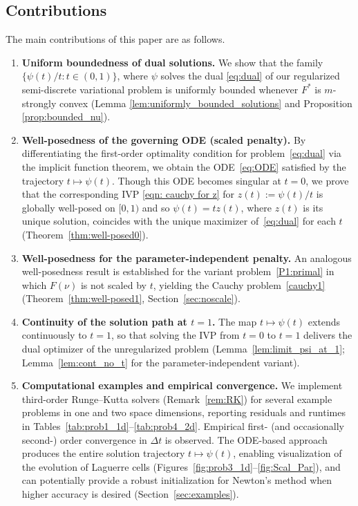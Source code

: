 \documentclass{scrartcl}
\theoremstyle{plain}
\theoremstyle{definition}
\begin{document}
\subsection*{Contributions}

The main contributions of this paper are as follows.

\begin{enumerate}
  \item \textbf{Uniform boundedness of dual solutions.} We show that the family $\{\psi(t)/t : t \in (0,1)\}$,  where $\psi$ solves the dual \eqref{eq:dual} of our regularized semi-discrete variational problem is uniformly bounded whenever $F^{*}$ is $m$-strongly convex (Lemma \ref{lem:uniformly_bounded_solutions} and Proposition \ref{prop:bounded_nu}). 

  \item \textbf{Well-posedness of the governing ODE (scaled penalty).} By differentiating the first-order optimality condition for problem~\eqref{eq:dual} via the implicit function theorem, we obtain the ODE~\eqref{eq:ODE} satisfied by the trajectory $t \mapsto \psi(t)$. Though this ODE becomes singular at $t=0$, we prove that the corresponding IVP \eqref{eqn: cauchy for z} for $z(t):=\psi(t)/t$  is globally well-posed on $[0,1)$ and so $\psi(t)=tz(t)$, where $z(t)$ is its unique solution, coincides with the unique maximizer of~\eqref{eq:dual} for each $t$ (Theorem~\ref{thm:well-posed0}).

  \item \textbf{Well-posedness for the parameter-independent penalty.} An analogous well-posedness result is established for the variant problem~\eqref{P1:primal} in which $F(\nu)$ is not scaled by $t$, yielding the Cauchy problem~\eqref{cauchy1} (Theorem~\ref{thm:well-posed1}, Section~\ref{sec:noscale}).

  \item \textbf{Continuity of the solution path at $t = 1$.} The map $t \mapsto \psi(t)$ extends continuously to $t = 1$, so that solving the IVP from $t = 0$ to $t = 1$ delivers the dual optimizer of the unregularized problem (Lemma~\ref{lem:limit_psi_at_1}; Lemma~\ref{lem:cont_no_t} for the parameter-independent variant).

  \item \textbf{Computational examples and empirical convergence.} We implement third-order Runge--Kutta solvers (Remark~\ref{rem:RK}) for several example problems in one and two space dimensions, reporting residuals and runtimes in Tables~\ref{tab:prob1_1d}--\ref{tab:prob4_2d}. Empirical first- (and occasionally second-) order convergence in $\Delta t$ is observed.  The ODE-based approach produces the entire solution trajectory $t \mapsto \psi(t)$, enabling visualization of the evolution of Laguerre cells (Figures~\ref{fig:prob3_1d}--\ref{fig:Scal_Par}), and can potentially provide a robust initialization for Newton's method when higher accuracy is desired (Section~\ref{sec:examples}).
\end{enumerate}
\end{document}
